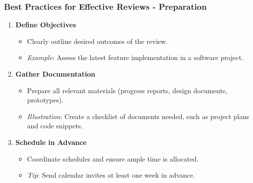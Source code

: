 \documentclass[aspectratio=169]{beamer}
\begin{document}
\begin{frame}[fragile]
    \frametitle{Best Practices for Effective Reviews - Preparation}
    \begin{enumerate}
        \item \textbf{Define Objectives}
            \begin{itemize}
                \item Clearly outline desired outcomes of the review.
                \item \textit{Example}: Assess the latest feature implementation in a software project.
            \end{itemize}
            
        \item \textbf{Gather Documentation}
            \begin{itemize}
                \item Prepare all relevant materials (progress reports, design documents, prototypes).
                \item \textit{Illustration}: Create a checklist of documents needed, such as project plans and code snippets.
            \end{itemize}
        
        \item \textbf{Schedule in Advance}
            \begin{itemize}
                \item Coordinate schedules and ensure ample time is allocated.
                \item \textit{Tip}: Send calendar invites at least one week in advance.
            \end{itemize}
    \end{enumerate}
\end{frame}
\end{document}
